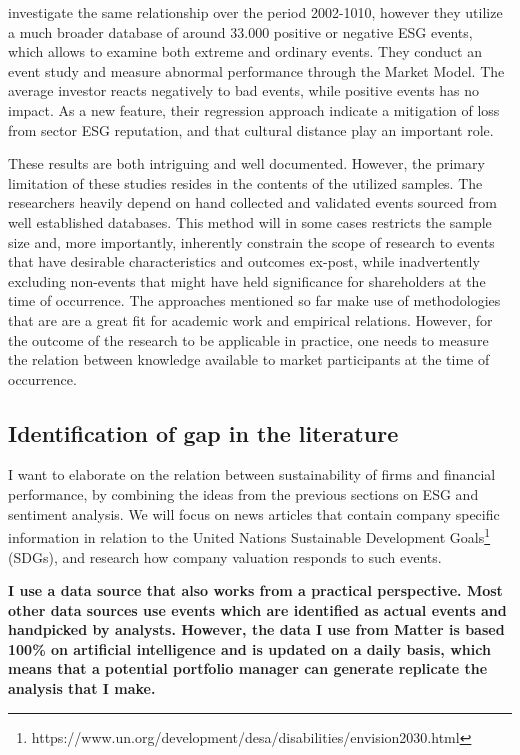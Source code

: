 \citeauthor{Blancard_ESG_sentiment} investigate the same relationship over the period 2002-1010, however they utilize a much broader database of around 33.000 positive or negative ESG events, which allows to examine both extreme and ordinary events. They conduct an event study and measure abnormal performance through the Market Model. The average investor reacts negatively to bad events, while positive events has no impact. As a new feature, their regression approach indicate a mitigation of loss from sector ESG reputation, and that cultural distance play an important role. 

These results are both intriguing and well documented. However, the primary limitation of these studies resides in the contents of the utilized samples. The researchers heavily depend on hand collected and validated events sourced from well established databases. This method will in some cases restricts the sample size and, more importantly, inherently constrain the scope of research to events that have desirable characteristics and outcomes ex-post, while inadvertently excluding non-events that might have held significance for shareholders at the time of occurrence. The approaches mentioned so far make use of methodologies that are are a great fit for academic work and empirical relations. However, for the outcome of the research to be applicable in practice, one needs to measure the relation between knowledge available to market participants at the time of occurrence. 





\subsection{Identification of gap in the literature}


I want to elaborate on the relation between sustainability of firms and financial performance, by combining the ideas from the previous sections on ESG and sentiment analysis. We will focus on news articles that contain company specific information in relation to the United Nations Sustainable Development Goals\footnote{https://www.un.org/development/desa/disabilities/envision2030.html} (SDGs), and research how company valuation responds to such events. 


\textbf{I use a data source that also works from a practical perspective. Most other data sources use events which are identified as actual events and handpicked by analysts. However, the data I use from Matter is based 100\% on artificial intelligence and is updated on a daily basis, which means that a potential portfolio manager can generate replicate the analysis that I make.} 